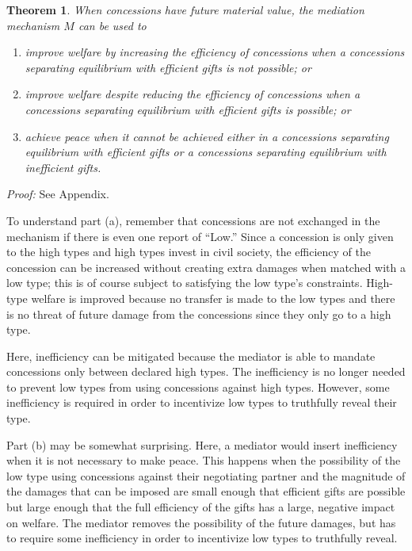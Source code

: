 \documentclass[12pt, letterpaper]{article}
\newtheorem{theorem}{Theorem}
\begin{document}
\begin{theorem}
	When concessions have future material value, the mediation mechanism $M$ can be used to
	\begin{enumerate}
		\item[(a)] improve welfare by increasing the efficiency of concessions when a \emph{concessions separating equilibrium with efficient gifts} is not possible; or
		\item[(b)] improve welfare despite reducing the efficiency of concessions when a \emph{concessions separating equilibrium with efficient gifts} is possible; or
		\item[(c)] achieve peace when it cannot be achieved either in a \emph{concessions separating equilibrium with efficient gifts} or a \emph{concessions separating equilibrium with inefficient gifts}.
	\end{enumerate}
	\label{theorem:medwel}
\end{theorem}
\emph{Proof:} See Appendix.

To understand part (a), remember that concessions are not exchanged in the mechanism if there is even one report of ``Low.'' Since a concession is only given to the high types and high types invest in civil society, the efficiency of the concession can be increased without creating extra damages when matched with a low type; this is of course subject to satisfying the low type's constraints. High-type welfare is improved because no transfer is made to the low types and there is no threat of future damage from the concessions since they only go to a high type.

Here, inefficiency can be mitigated because the mediator is able to mandate concessions only between declared high types. The inefficiency is no longer needed to prevent low types from using concessions against high types. However, some inefficiency is required in order to incentivize low types to truthfully reveal their type.

Part (b) may be somewhat surprising. Here, a mediator would insert inefficiency when it is not necessary to make peace. This happens when the possibility of the low type using concessions against their negotiating partner and the magnitude of the damages that can be imposed are small enough that efficient gifts are possible but large enough that the full efficiency of the gifts has a large, negative impact on welfare. The mediator removes the possibility of the future damages, but has to require some inefficiency in order to incentivize low types to truthfully reveal.
\end{document}
